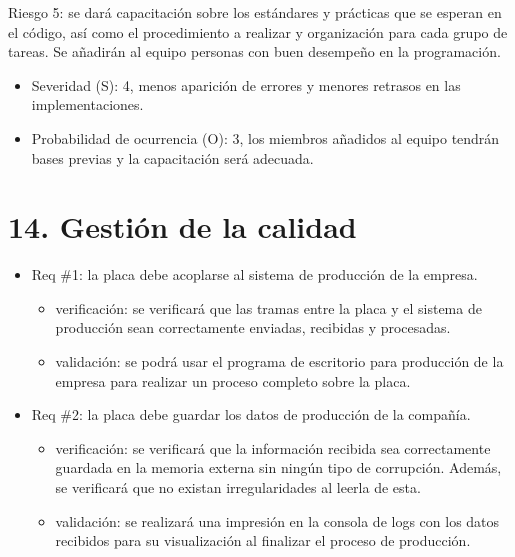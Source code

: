 \documentclass[
11pt, %
]{charter}
\begin{document}
Riesgo 5: se dará capacitación sobre los estándares y prácticas que se esperan en el código, así como el procedimiento a realizar y organización para cada grupo de tareas. Se añadirán al equipo personas con buen desempeño en la programación.
\begin{itemize}
	\item Severidad (S): 4, menos aparición de errores y menores retrasos en las implementaciones.   
	\item Probabilidad de ocurrencia (O): 3, los miembros añadidos al equipo tendrán bases previas y la capacitación será adecuada.
\end{itemize}

\section{14. Gestión de la calidad}
\label{sec:calidad}

\begin{itemize} 
\item Req \#1: la placa debe acoplarse al sistema de producción de la empresa.

\begin{itemize}
	\item verificación: se verificará que las tramas entre la placa y el sistema de producción sean correctamente enviadas, recibidas y procesadas.
	\item validación: se podrá usar el programa de escritorio para producción de la empresa para realizar un proceso completo sobre la placa.
\end{itemize}

\end{itemize}

\begin{itemize} 
\item Req \#2: la placa debe guardar los datos de producción de la compañía.

\begin{itemize}
	\item verificación: se verificará que la información recibida sea correctamente guardada en la memoria externa sin ningún tipo de corrupción. Además, se verificará que no existan irregularidades al leerla de esta.  
	\item validación: se realizará una impresión en la consola de logs con los datos recibidos para su visualización al finalizar el proceso de producción.
\end{itemize}

\end{itemize}
\end{document}
